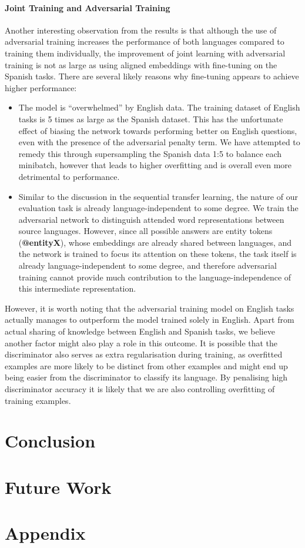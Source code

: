 \documentclass[]{article}
\begin{document}
\paragraph{Joint Training and Adversarial Training}
Another interesting observation from the results is that although the use of adversarial training increases the performance of both languages compared to training them individually, the improvement of joint learning with adversarial training is not as large as using aligned embeddings with fine-tuning on the Spanish tasks. There are several likely reasons why fine-tuning appears to achieve higher performance:
\begin{itemize}
	\item The model is “overwhelmed” by English data. The training dataset of English tasks is 5 times as large as the Spanish dataset. This has the unfortunate effect of biasing the network towards performing better on English questions, even with the presence of the adversarial penalty term. We have attempted to remedy this through supersampling the Spanish data 1:5 to balance each minibatch, however that leads to higher overfitting and is overall even more detrimental to performance.
	\item Similar to the discussion in the sequential transfer learning, the nature of our evaluation task is already language-independent to some degree. We train the adversarial network to distinguish attended word representations between source languages. However, since all possible answers are entity tokens (\textbf{@entityX}), whose embeddings are already shared between languages, and the network is trained to focus its attention on these tokens, the task itself is already language-independent to some degree, and therefore adversarial training cannot provide much contribution to the language-independence of this intermediate representation.
\end{itemize}

However, it is worth noting that the adversarial training model on English tasks actually manages to outperform the model trained solely in English. Apart from actual sharing of knowledge between English and Spanish tasks, we believe another factor might also play a role in this outcome. It is possible that the discriminator also serves as extra regularisation during training, as overfitted examples are more likely to be distinct from other examples and might end up being easier from the discriminator to classify its language. By penalising high discriminator accuracy it is likely that we are also controlling overfitting of training examples.



\section{Conclusion}



\section{Future Work}


\newpage




\newpage
\appendix
\section{Appendix}
\end{document}
